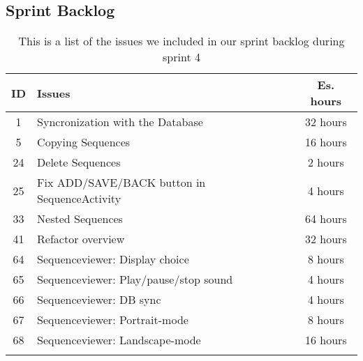 \subsection{Sprint Backlog}\label{subsec:spr4_sprblog}
\begin{longtable} { | c | p{12cm} | c | } 
\hline
	ID 	&	Issues	&	Es. hours  \\\hline
	1	& 	Syncronization with the Database		&	32 hours  \\\hline
	5	& 	Copying Sequences		&	16 hours  \\\hline
	24	& 	Delete Sequences		&	2 hours  \\\hline
	25	& 	Fix ADD/SAVE/BACK button in SequenceActivity		&	4 hours  \\\hline
	33	& 	Nested Sequences		&	64 hours  \\\hline
	41	& 	Refactor overview		&	32 hours  \\\hline
	64	& 	Sequenceviewer: Display choice		&	8 hours  \\\hline
	65	& 	Sequenceviewer: Play/pause/stop sound		&	4 hours  \\\hline
	66	& 	Sequenceviewer: DB sync		&	4 hours  \\\hline
	67	& 	Sequenceviewer: Portrait-mode		&	8 hours  \\\hline
	68	& 	Sequenceviewer: Landscape-mode	&	16 hours  \\\hline
\caption{This is a list of the issues we included in our sprint backlog during sprint 4}
\label{tab:spr4_prodblog}
\end{longtable}